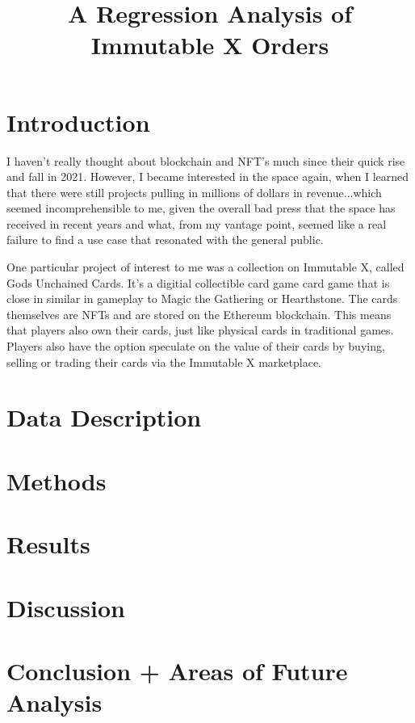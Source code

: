 \documentclass[12pt,twocolumn]{article}
\title{A Regression Analysis of Immutable X Orders}
\begin{document}
\maketitle

\section{Introduction}
\label{sec:introduction}

I haven't really thought about blockchain and NFT's much since their quick rise and fall in 2021. However, I became interested in the space 
again, when I learned that there were still projects pulling in millions of dollars in revenue...which seemed incomprehensible to me, 
given the overall bad press that the space has received in recent years and what, from my vantage point, seemed like a real failure to find 
a use case that resonated with the general public. 

One particular project of interest to me was a collection on Immutable X, called Gods Unchained Cards. It's a digitial collectible card game
card game that is close in similar in gameplay to Magic the Gathering or Hearthstone. The cards themselves are NFTs and are stored on the Ethereum blockchain. 
This means that players also own their cards, just like physical cards in traditional games. Players also have the option speculate on the value 
of their cards by buying, selling or trading their cards via the Immutable X marketplace. 



\section{Data Description}
\label{sec:data}

\section{Methods}
\label{sec:methods}

\section{Results}
\label{sec:results}

\section{Discussion}
\label{sec:discussion}

\section{Conclusion + Areas of Future Analysis}
\label{sec:conclusion}
\end{document}
